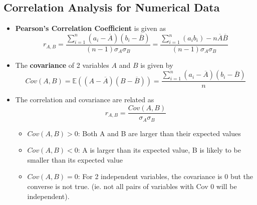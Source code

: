 \documentclass{article}
\theoremstyle{plain}
\theoremstyle{definition}
\begin{document}
\subsection{Correlation Analysis for Numerical Data}
\begin{itemize}
    \item \textbf{Pearson's Correlation Coefficient} is given as
    \begin{equation}
        r_{A, B} = \frac{\sum\limits_{i=1}^{n} (a_i - \overline{A})(b_i - \overline{B})}{(n-1)\sigma_A \sigma_B} = \frac{\sum\limits_{i=1}^{n} (a_i b_i) - n\overline{A}\overline{B}}{(n-1)\sigma_A \sigma_B}
    \end{equation}
    
    \item The \textbf{covariance} of 2 variables $A$ and $B$ is given by
    \begin{equation}
        Cov(A, B) = \mathbb{E}((A-\overline{A})(B-\overline{B})) = \frac{\sum\limits_{i=1}^{n} (a_i - \overline{A})(b_i - \overline{B})}{n} 
    \end{equation}
    
    \item The correlation and covariance are related as
    \begin{equation}
        r_{A, B} = \frac{Cov(A, B)}{\sigma_A \sigma_B}
    \end{equation}
    
    \begin{itemize}
        \item $Cov(A, B) > 0$: Both A and B are larger than their expected values
        
        \item $Cov(A, B) < 0$: A is larger than its expected value, B is likely to be smaller than its expected value
        
        \item $Cov(A, B) = 0$: For 2 independent variables, the covariance is 0 but the converse is not true. (ie. not all pairs of variables with Cov 0 will be independent). 
    \end{itemize}
\end{itemize}
\end{document}
